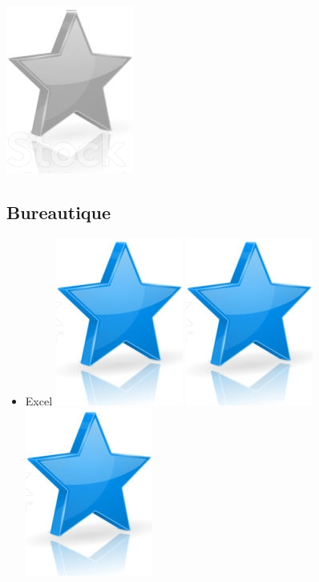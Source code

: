\documentclass[10pt,a4paper,sans]{article}
\begin{document}
\begin{minipage}[t]{0.26\textwidth}
\begin{mdframed}[style=cadreCompetences]
\begin{itemize}
{                    \includegraphics[scale=0.20]{img/empty_star.png}}
            \end{itemize}
        \subsection{Bureautique}
            \begin{itemize}
                \item{Excel
                    \hfill
                    \includegraphics[scale=0.20]{img/star.png} \hspace{-0.2cm}
                    \includegraphics[scale=0.20]{img/star.png} \hspace{-0.2cm}
                    \includegraphics[scale=0.20]{img/star.png} \hspace{-0.2cm}
}
\end{itemize}
\end{mdframed}
\end{minipage}
\end{document}
